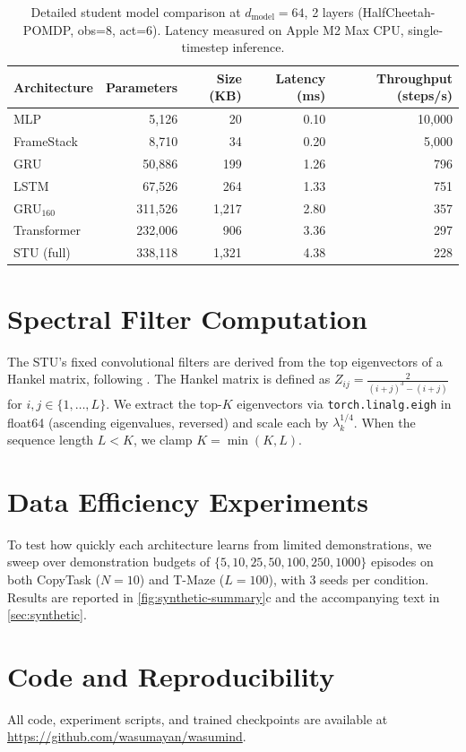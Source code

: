 \begin{table}[ht]
\centering
\caption{Detailed student model comparison at $d_\text{model}=64$, 2 layers (HalfCheetah-POMDP, obs=8, act=6). Latency measured on Apple M2 Max CPU, single-timestep inference.}
\begin{tabular}{lrrrr}
\toprule
Architecture & Parameters & Size (KB) & Latency (ms) & Throughput (steps/s) \\
\midrule
MLP           & 5{,}126 & 20 & 0.10 & 10{,}000 \\
FrameStack    & 8{,}710 & 34 & 0.20 & 5{,}000 \\
GRU           & 50{,}886 & 199 & 1.26 & 796 \\
LSTM          & 67{,}526 & 264 & 1.33 & 751 \\
GRU$_{160}$   & 311{,}526 & 1{,}217 & 2.80 & 357 \\
Transformer   & 232{,}006 & 906 & 3.36 & 297 \\
STU (full)    & 338{,}118 & 1{,}321 & 4.38 & 228 \\
\bottomrule
\end{tabular}
\end{table}

\section{Spectral Filter Computation}

The STU's fixed convolutional filters are derived from the top eigenvectors of a Hankel matrix, following \citet{agarwal2024spectral}.
The Hankel matrix is defined as $Z_{ij} = \frac{2}{(i+j)^3 - (i+j)}$ for $i,j \in \{1, \ldots, L\}$.
We extract the top-$K$ eigenvectors via \texttt{torch.linalg.eigh} in float64 (ascending eigenvalues, reversed) and scale each by $\lambda_k^{1/4}$.
When the sequence length $L < K$, we clamp $K = \min(K, L)$.

\section{Data Efficiency Experiments}

To test how quickly each architecture learns from limited demonstrations, we sweep over demonstration budgets of $\{5, 10, 25, 50, 100, 250, 1000\}$ episodes on both CopyTask ($N{=}10$) and T-Maze ($L{=}100$), with 3 seeds per condition.
Results are reported in \cref{fig:synthetic-summary}c and the accompanying text in \cref{sec:synthetic}.

\section{Code and Reproducibility}

All code, experiment scripts, and trained checkpoints are available at \url{https://github.com/wasumayan/wasumind}.
\endgroup
